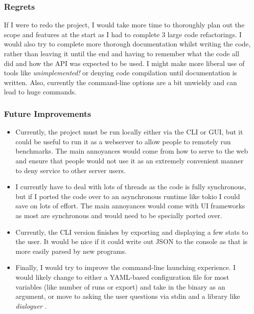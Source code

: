 \documentclass{article}
\begin{document}
\begin{multicols*}{2}
\subsubsection{Regrets}
If I were to redo the project, I would take more time to thoroughly plan out the scope and features at the start as I had to complete 3 large code refactorings. I would also try to complete more thorough documentation whilst writing the code, rather than leaving it until the end and having to remember what the code all did and how the API was expected to be used. I might make more liberal use of tools like \textit{unimplemented!} or denying code compilation until documentation is written. Also, currently the command-line options are a bit unwieldy and can lead to huge commands.

\subsubsection{Future Improvements}
\begin{itemize}
	\item Currently, the project must be run locally either via the CLI or GUI, but it could be useful to run it as a webserver to allow people to remotely run benchmarks. The main annoyances would come from how to serve to the web and ensure that people would not use it as an extremely convenient manner to deny service to other server users.
	\item I currently have to deal with lots of threads as the code is fully synchronous, but if I ported the code over to an asynchronous runtime like tokio \autocite{TokioAsynchronousRust} I could save on lots of effort. The main annoyances would come with UI frameworks as most are synchronous and would need to be specially ported over.
	\item Currently, the CLI version finishes by exporting and displaying a few stats to the user. It would be nice if it could write out JSON to the console as that is more easily parsed by new programs.
	\item Finally, I would try to improve the command-line launching experience. I would likely change to either a YAML-based configuration file for most variables (like number of runs or export) and take in the binary as an argument, or move to asking the user questions via stdin and a library like \textit{dialoguer} \autocite{Dialoguer2023}.
\end{itemize}


\end{multicols*}

\newpage
\printbibliography
\end{document}

